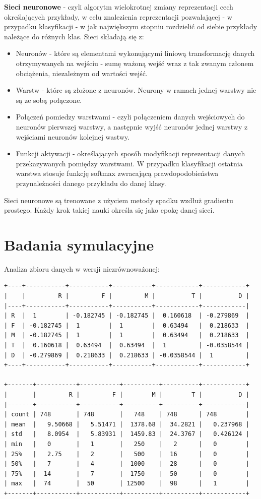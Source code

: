 \documentclass[11pt, a4paper, notitlepage]{report}
\begin{document}
	{\bf Sieci neuronowe} - czyli algorytm wielokrotnej zmiany reprezentacji cech określających przykłady, w celu znalezienia reprezentacji pozwalającej - w przypadku klasyfikacji - w jak największym stopniu rozdzielić od siebie przykłady należące do różnych klas. Sieci składają się z:
	\begin{itemize}
	  \item Neuronów - które są elementami wykonującymi liniową transformację danych otrzymywanych na wejściu - sumę ważoną wejść wraz z tak zwanym członem obciążenia, niezależnym od wartości wejść.
	  \item Warstw - które są złożone z neuronów. Neurony w ramach jednej warstwy nie są ze sobą połączone.
	  \item Połączeń pomiedzy warstwami - czyli połączeniem danych wejściowych do neuronów pierwszej warstwy, a następnie wyjść neuronów jednej warstwy z wejściami neuronów kolejnej wastwy.
	 \item Funkcji aktywacji - określających sposób modyfikacji reprezentacji danych przekazywanych pomiędzy warstwami. W przypadku klasyfikacji ostatnia warstwa stosuje funkcję softmax zwracającą prawdopodobieństwa przynależności danego przykładu do danej klasy.
	\end{itemize}
	Sieci neuronowe są trenowane z użyciem metody spadku wzdłuż gradientu prostego. Każdy krok takiej nauki określa się jako epokę danej sieci.
\section{Badania symulacyjne}
Analiza zbioru danych w wersji niezrównoważonej:
\begin{verbatim}
+----+-----------+-----------+-----------+------------+------------+
|    |         R |         F |         M |          T |          D |
|----+-----------+-----------+-----------+------------+------------|
| R  |  1        | -0.182745 | -0.182745 |  0.160618  | -0.279869  |
| F  | -0.182745 |  1        |  1        |  0.63494   |  0.218633  |
| M  | -0.182745 |  1        |  1        |  0.63494   |  0.218633  |
| T  |  0.160618 |  0.63494  |  0.63494  |  1         | -0.0358544 |
| D  | -0.279869 |  0.218633 |  0.218633 | -0.0358544 |  1         |
+----+-----------+-----------+-----------+------------+------------+

+-------+-----------+-----------+----------+----------+------------+
|       |         R |         F |        M |        T |          D |
|-------+-----------+-----------+----------+----------+------------|
| count | 748       | 748       |   748    | 748      | 748        |
| mean  |   9.50668 |   5.51471 |  1378.68 |  34.2821 |   0.237968 |
| std   |   8.0954  |   5.83931 |  1459.83 |  24.3767 |   0.426124 |
| min   |   0       |   1       |   250    |   2      |   0        |
| 25%   |   2.75    |   2       |   500    |  16      |   0        |
| 50%   |   7       |   4       |  1000    |  28      |   0        |
| 75%   |  14       |   7       |  1750    |  50      |   0        |
| max   |  74       |  50       | 12500    |  98      |   1        |
+-------+-----------+-----------+----------+----------+------------+
\end{verbatim}
\end{document}
